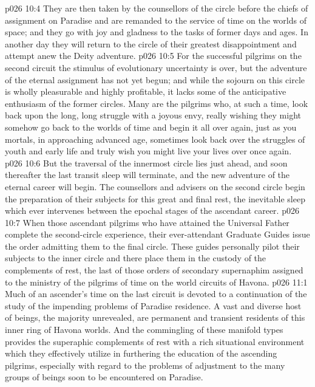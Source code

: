 \vs p026 10:4 They are then taken by the counsellors of the circle before the chiefs of assignment on Paradise and are remanded to the service of time on the worlds of space; and they go with joy and gladness to the tasks of former days and ages. In another day they will return to the circle of their greatest disappointment and attempt anew the Deity adventure.
\vs p026 10:5 For the successful pilgrims on the second circuit the stimulus of evolutionary uncertainty is over, but the adventure of the eternal assignment has not yet begun; and while the sojourn on this circle is wholly pleasurable and highly profitable, it lacks some of the anticipative enthusiasm of the former circles. Many are the pilgrims who, at such a time, look back upon the long, long struggle with a joyous envy, really wishing they might somehow go back to the worlds of time and begin it all over again, just as you mortals, in approaching advanced age, sometimes look back over the struggles of youth and early life and truly wish you might live your lives over once again.
\vs p026 10:6 But the traversal of the innermost circle lies just ahead, and soon thereafter the last transit sleep will terminate, and the new adventure of the eternal career will begin. The counsellors and advisers on the second circle begin the preparation of their subjects for this great and final rest, the inevitable sleep which ever intervenes between the epochal stages of the ascendant career.
\vs p026 10:7 When those ascendant pilgrims who have attained the Universal Father complete the second\hyp{}circle experience, their ever\hyp{}attendant Graduate Guides issue the order admitting them to the final circle. These guides personally pilot their subjects to the inner circle and there place them in the custody of the complements of rest, the last of those orders of secondary supernaphim assigned to the ministry of the pilgrims of time on the world circuits of Havona.
\vs p026 11:1 Much of an ascender’s time on the last circuit is devoted to a continuation of the study of the impending problems of Paradise residence. A vast and diverse host of beings, the majority unrevealed, are permanent and transient residents of this inner ring of Havona worlds. And the commingling of these manifold types provides the superaphic complements of rest with a rich situational environment which they effectively utilize in furthering the education of the ascending pilgrims, especially with regard to the problems of adjustment to the many groups of beings soon to be encountered on Paradise.

